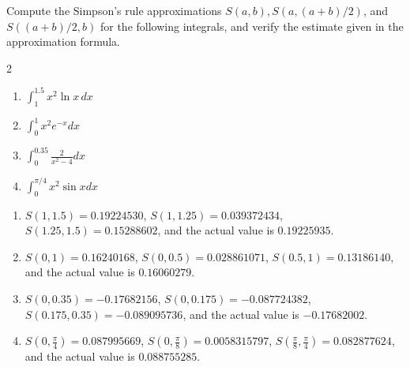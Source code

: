 \begin{myexercise}%
Compute the Simpson's rule approximations $S(a, b), S(a,(a+b) / 2)$, and $S((a+b) / 2, b)$ for the following integrals, and verify the estimate given in the approximation formula.
\begin{multicols}{2}
\begin{enumerate}[label=(\alph*)]
\item $\int_1^{1.5}x^2\ln x\, dx$
\item $\int_{0}^{1} x^{2} e^{-x} d x$
\item $\int_{0}^{0.35} \frac{2}{x^{2}-4} d x$
\item $\int_{0}^{\pi / 4} x^{2} \sin x d x$
\end{enumerate}
\end{multicols}

\begin{mysolution}
\begin{enumerate}[label=(\alph*)]
\item $S(1,1.5)=0.19224530$, $S(1,1.25)=0.039372434$, $S(1.25,1.5)=0.15288602$, and the actual value is $0.19225935$.
\item $S(0,1)=0.16240168$, $S(0,0.5)=0.028861071$, $S(0.5,1)=0.13186140$, and the actual value is $0.16060279$.
\item $S(0,0.35)=-0.17682156$, $S(0,0.175)=-0.087724382$, $S(0.175,0.35)=-0.089095736$, and the actual value is $-0.17682002$.
\item $S\left(0,\frac{\pi}{4}\right)=0.087995669$, $S\left(0,\frac{\pi}{8}\right)=0.0058315797$, $S\left(\frac{\pi}{8},\frac{\pi}{4}\right)=0.082877624$, and the actual value is $0.088755285$.
\end{enumerate}
\end{mysolution}
\end{myexercise}

